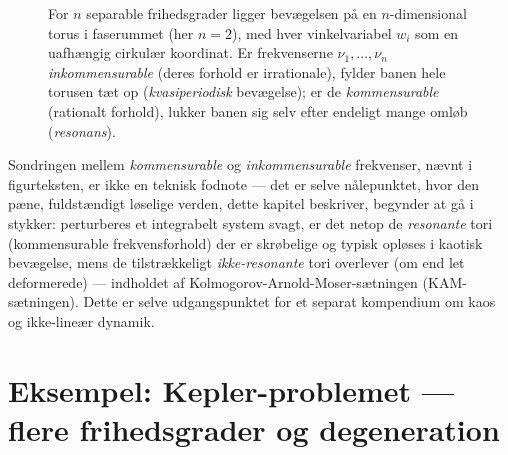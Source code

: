 \begin{figure}[htbp]
  \centering
  \caption{For $n$ separable frihedsgrader ligger bevægelsen på en
  $n$-dimensional torus i faserummet (her $n=2$), med hver
  vinkelvariabel $w_i$ som en uafhængig cirkulær koordinat. Er
  frekvenserne $\nu_1,\dots,\nu_n$ \emph{inkommensurable} (deres
  forhold er irrationale), fylder banen hele torusen tæt op
  (\emph{kvasiperiodisk} bevægelse); er de \emph{kommensurable}
  (rationalt forhold), lukker banen sig selv efter endeligt mange
  omløb (\emph{resonans}).}
  \label{fig:torus}
\end{figure}

Sondringen mellem \emph{kommensurable} og \emph{inkommensurable}
frekvenser, nævnt i figurteksten, er ikke en teknisk fodnote — det er
selve nålepunktet, hvor den pæne, fuldstændigt løselige verden, dette
kapitel beskriver, begynder at gå i stykker: perturberes et
integrabelt system svagt, er det netop de \emph{resonante} tori
(kommensurable frekvensforhold) der er skrøbelige og typisk opløses i
kaotisk bevægelse, mens de tilstrækkeligt \emph{ikke-resonante} tori
overlever (om end let deformerede) — indholdet af
Kolmogorov-Arnold-Moser-sætningen (KAM-sætningen). Dette er
selve udgangspunktet for et separat kompendium om kaos og
ikke-lineær dynamik.

\section{Eksempel: Kepler-problemet — flere frihedsgrader og degeneration}
\label{sec:kepler-action-angle}


